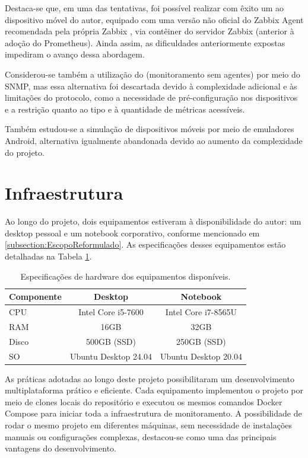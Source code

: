 Destaca-se que, em uma das tentativas, foi possível realizar com êxito um  ao dispositivo móvel do autor, equipado com uma versão não oficial do Zabbix Agent recomendada pela própria Zabbix \citep{unofficialzabbixagent2025}, via contêiner do servidor Zabbix (anterior à adoção do Prometheus). Ainda assim, as dificuldades anteriormente expostas impediram o avanço dessa abordagem.

Considerou-se também a utilização do  (monitoramento sem agentes) por meio do SNMP, mas essa alternativa foi descartada devido à complexidade adicional e às limitações do protocolo, como a necessidade de pré-configuração nos dispositivos e a restrição quanto ao tipo e à quantidade de métricas acessíveis.

Também estudou-se a simulação de dispositivos móveis por meio de emuladores Android, alternativa igualmente abandonada devido ao aumento da complexidade do projeto.


\section{Infraestrutura}
\label{section:Infraestrutura}

Ao longo do projeto, dois equipamentos estiveram à disponibilidade do autor: um desktop pessoal e um notebook corporativo, conforme mencionado em \ref{subsection:EscopoReformulado}. As especificações desses equipamentos estão detalhadas na Tabela \ref{tab:available-hardware}.

\begin{table}[htbp]
\centering
\caption{Especificações de hardware dos equipamentos disponíveis.}
\label{tab:available-hardware}
\begin{tabular}{lcc}
\toprule
\textbf{Componente} & \textbf{Desktop} & \textbf{Notebook} \\
\midrule
CPU   & Intel Core i5-7600   & Intel Core i7-8565U \\
RAM   & 16GB                 & 32GB                \\
Disco & 500GB (SSD)            & 250GB (SSD)          \\
SO & Ubuntu Desktop 24.04 & Ubuntu Desktop 20.04 \\
\bottomrule
\end{tabular}
\end{table}

As práticas adotadas ao longo deste projeto possibilitaram um desenvolvimento multiplataforma prático e eficiente. Cada equipamento implementou o projeto por meio de clones locais do repositório e executou os mesmos comandos Docker Compose para iniciar toda a infraestrutura de monitoramento. A possibilidade de rodar o mesmo projeto em diferentes máquinas, sem necessidade de instalações manuais ou configurações complexas, destacou-se como uma das principais vantagens do desenvolvimento.


